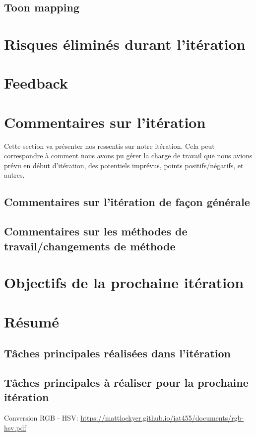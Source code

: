 \documentclass[12pt,titlepage,french]{article}
\begin{document}
\subsection{Toon mapping}

\section{Risques éliminés durant l'itération}


\section{Feedback}



\section{Commentaires sur l'itération}

Cette section va présenter nos ressentis sur notre itération. Cela peut correspondre à comment nous avons pu gérer la charge de travail que nous avions prévu en début d'itération, des potentiels imprévus, points positifs/négatifs, et autres.

\subsection{Commentaires sur l'itération de façon générale}



\subsection{Commentaires sur les méthodes de travail/changements de méthode}


\section{Objectifs de la prochaine itération}




\section{Résumé}
\subsection{Tâches principales réalisées dans l'itération}

\subsection{Tâches principales à réaliser pour la prochaine itération}

\begin{thebibliography}{3}

 Conversion RGB - HSV: \newline
\url{https://mattlockyer.github.io/iat455/documents/rgb-hsv.pdf}
\end{thebibliography}
\end{document}
